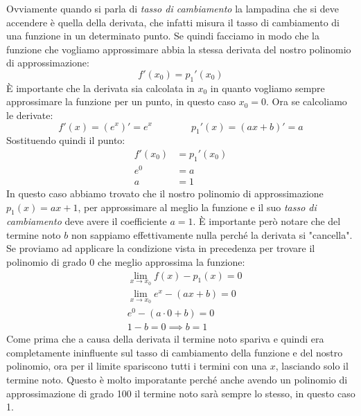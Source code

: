 Ovviamente quando si parla di \textit{tasso di cambiamento} la lampadina che si deve accendere è quella della derivata, che infatti misura il tasso di cambiamento di una funzione in un determinato punto. Se quindi facciamo in modo che la funzione che vogliamo approssimare abbia la stessa derivata del nostro polinomio di approssimazione:
\begin{equation*}
	f'(x_0) = p_1'(x_0)
\end{equation*}
È importante che la derivata sia calcolata in $x_0$ in quanto vogliamo sempre approssimare la funzione per un punto, in questo caso $x_0 = 0$. Ora se calcoliamo le derivate:
\begin{equation*}
	f'(x) = (e^x)' = e^x \qquad \qquad p_1'(x) = (ax + b)' = a
\end{equation*}
Sostituendo quindi il punto:
\begin{align*}
	f'(x_0) &= p_1'(x_0)\\
	e^{0} & = a\\
	a & = 1
\end{align*}
In questo caso abbiamo trovato che il nostro polinomio di approssimazione $p_1(x) = ax + 1$, per approssimare al meglio la funzione e il suo \textit{tasso di cambiamento} deve avere il coefficiente $a = 1$. È importante però notare che del termine noto $b$ non sappiamo effettivamente nulla perché la derivata si "cancella". Se proviamo ad applicare la condizione vista in precedenza per trovare il polinomio di grado 0 che meglio approssima la funzione:
\begin{align*}
	&\lim_{x \to x_0} f(x) - p_1(x) = 0\\
	&\lim_{x \to x_0} e^x - (ax + b) = 0\\
	&e^0 - (a \cdot 0 + b) = 0\\
	&1 - b = 0 \implies b = 1
\end{align*}
Come prima che a causa della derivata il termine noto spariva e quindi era completamente ininfluente sul tasso di cambiamento della funzione e del nostro polinomio, ora per il limite spariscono tutti i termini con una $x$, lasciando solo il termine noto. Questo è molto imporatante perché anche avendo un polinomio di approssimazione di grado 100 il termine noto sarà sempre lo stesso, in questo caso 1.

